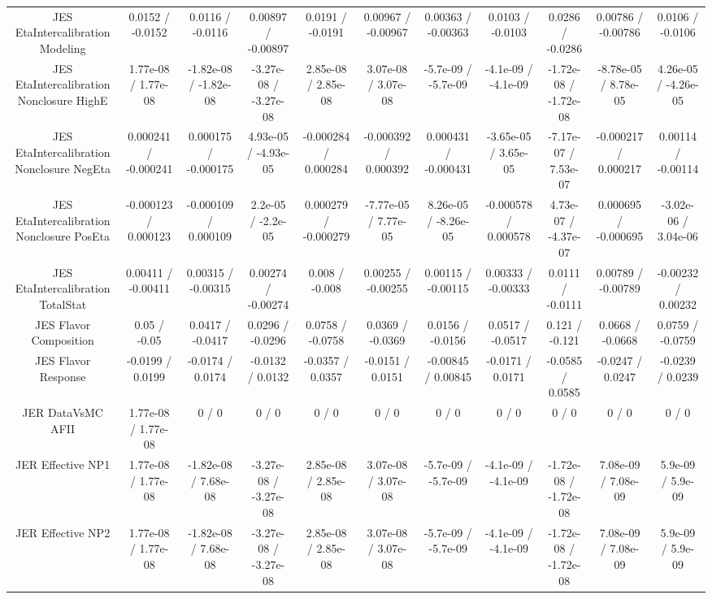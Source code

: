 \begin{table}[htbp]
\begin{center}
\begin{tabular}{|c|c|c|c|c|c|c|c|c|c|c|}
  JES EtaIntercalibration Modeling & 0.0152 / -0.0152 & 0.0116 / -0.0116 & 0.00897 / -0.00897 & 0.0191 / -0.0191 & 0.00967 / -0.00967 & 0.00363 / -0.00363 & 0.0103 / -0.0103 & 0.0286 / -0.0286 & 0.00786 / -0.00786 & 0.0106 / -0.0106 \\ 
  JES EtaIntercalibration Nonclosure HighE & 1.77e-08 / 1.77e-08 & -1.82e-08 / -1.82e-08 & -3.27e-08 / -3.27e-08 & 2.85e-08 / 2.85e-08 & 3.07e-08 / 3.07e-08 & -5.7e-09 / -5.7e-09 & -4.1e-09 / -4.1e-09 & -1.72e-08 / -1.72e-08 & -8.78e-05 / 8.78e-05 & 4.26e-05 / -4.26e-05 \\ 
  JES EtaIntercalibration Nonclosure NegEta & 0.000241 / -0.000241 & 0.000175 / -0.000175 & 4.93e-05 / -4.93e-05 & -0.000284 / 0.000284 & -0.000392 / 0.000392 & 0.000431 / -0.000431 & -3.65e-05 / 3.65e-05 & -7.17e-07 / 7.53e-07 & -0.000217 / 0.000217 & 0.00114 / -0.00114 \\ 
  JES EtaIntercalibration Nonclosure PosEta & -0.000123 / 0.000123 & -0.000109 / 0.000109 & 2.2e-05 / -2.2e-05 & 0.000279 / -0.000279 & -7.77e-05 / 7.77e-05 & 8.26e-05 / -8.26e-05 & -0.000578 / 0.000578 & 4.73e-07 / -4.37e-07 & 0.000695 / -0.000695 & -3.02e-06 / 3.04e-06 \\ 
  JES EtaIntercalibration TotalStat & 0.00411 / -0.00411 & 0.00315 / -0.00315 & 0.00274 / -0.00274 & 0.008 / -0.008 & 0.00255 / -0.00255 & 0.00115 / -0.00115 & 0.00333 / -0.00333 & 0.0111 / -0.0111 & 0.00789 / -0.00789 & -0.00232 / 0.00232 \\ 
  JES Flavor Composition & 0.05 / -0.05 & 0.0417 / -0.0417 & 0.0296 / -0.0296 & 0.0758 / -0.0758 & 0.0369 / -0.0369 & 0.0156 / -0.0156 & 0.0517 / -0.0517 & 0.121 / -0.121 & 0.0668 / -0.0668 & 0.0759 / -0.0759 \\ 
  JES Flavor Response & -0.0199 / 0.0199 & -0.0174 / 0.0174 & -0.0132 / 0.0132 & -0.0357 / 0.0357 & -0.0151 / 0.0151 & -0.00845 / 0.00845 & -0.0171 / 0.0171 & -0.0585 / 0.0585 & -0.0247 / 0.0247 & -0.0239 / 0.0239 \\ 
  JER DataVsMC AFII & 1.77e-08 / 1.77e-08 & 0 / 0 & 0 / 0 & 0 / 0 & 0 / 0 & 0 / 0 & 0 / 0 & 0 / 0 & 0 / 0 & 0 / 0 \\ 
  JER Effective NP1 & 1.77e-08 / 1.77e-08 & -1.82e-08 / 7.68e-08 & -3.27e-08 / -3.27e-08 & 2.85e-08 / 2.85e-08 & 3.07e-08 / 3.07e-08 & -5.7e-09 / -5.7e-09 & -4.1e-09 / -4.1e-09 & -1.72e-08 / -1.72e-08 & 7.08e-09 / 7.08e-09 & 5.9e-09 / 5.9e-09 \\ 
  JER Effective NP2 & 1.77e-08 / 1.77e-08 & -1.82e-08 / 7.68e-08 & -3.27e-08 / -3.27e-08 & 2.85e-08 / 2.85e-08 & 3.07e-08 / 3.07e-08 & -5.7e-09 / -5.7e-09 & -4.1e-09 / -4.1e-09 & -1.72e-08 / -1.72e-08 & 7.08e-09 / 7.08e-09 & 5.9e-09 / 5.9e-09 \\ 

\end{tabular}
\end{center}
\end{table}
